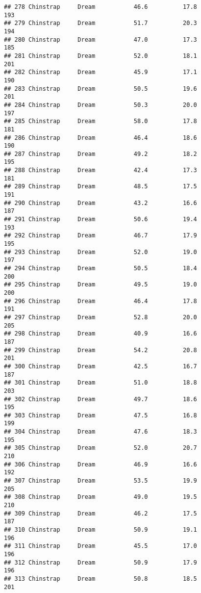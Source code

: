\documentclass[
]{article}
\begin{document}
\begin{verbatim}
## 278 Chinstrap     Dream           46.6          17.8               193
## 279 Chinstrap     Dream           51.7          20.3               194
## 280 Chinstrap     Dream           47.0          17.3               185
## 281 Chinstrap     Dream           52.0          18.1               201
## 282 Chinstrap     Dream           45.9          17.1               190
## 283 Chinstrap     Dream           50.5          19.6               201
## 284 Chinstrap     Dream           50.3          20.0               197
## 285 Chinstrap     Dream           58.0          17.8               181
## 286 Chinstrap     Dream           46.4          18.6               190
## 287 Chinstrap     Dream           49.2          18.2               195
## 288 Chinstrap     Dream           42.4          17.3               181
## 289 Chinstrap     Dream           48.5          17.5               191
## 290 Chinstrap     Dream           43.2          16.6               187
## 291 Chinstrap     Dream           50.6          19.4               193
## 292 Chinstrap     Dream           46.7          17.9               195
## 293 Chinstrap     Dream           52.0          19.0               197
## 294 Chinstrap     Dream           50.5          18.4               200
## 295 Chinstrap     Dream           49.5          19.0               200
## 296 Chinstrap     Dream           46.4          17.8               191
## 297 Chinstrap     Dream           52.8          20.0               205
## 298 Chinstrap     Dream           40.9          16.6               187
## 299 Chinstrap     Dream           54.2          20.8               201
## 300 Chinstrap     Dream           42.5          16.7               187
## 301 Chinstrap     Dream           51.0          18.8               203
## 302 Chinstrap     Dream           49.7          18.6               195
## 303 Chinstrap     Dream           47.5          16.8               199
## 304 Chinstrap     Dream           47.6          18.3               195
## 305 Chinstrap     Dream           52.0          20.7               210
## 306 Chinstrap     Dream           46.9          16.6               192
## 307 Chinstrap     Dream           53.5          19.9               205
## 308 Chinstrap     Dream           49.0          19.5               210
## 309 Chinstrap     Dream           46.2          17.5               187
## 310 Chinstrap     Dream           50.9          19.1               196
## 311 Chinstrap     Dream           45.5          17.0               196
## 312 Chinstrap     Dream           50.9          17.9               196
## 313 Chinstrap     Dream           50.8          18.5               201

\end{verbatim}
\end{document}
